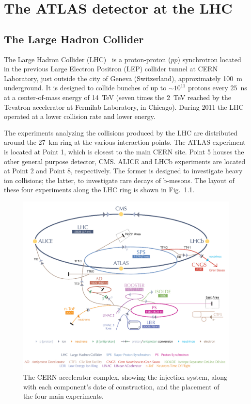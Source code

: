 
%
%
\chapter{The ATLAS detector at the LHC}

\section{The Large Hadron Collider}


The Large Hadron Collider  (LHC)~\cite{Breskin:1244506} is a proton-proton ($pp$) synchrotron located in the previous Large Electron Positron (LEP) collider tunnel at CERN Laboratory, just outside the city of Geneva (Switzerland), approximately 100~m underground. It is designed to collide bunches of up to $\sim 10^{11}$ protons every 25~ns at a center-of-mass energy of 14~TeV (seven times the 2~TeV reached by the Tevatron accelerator at Fermilab Laboratory, in Chicago). During 2011 the LHC operated at a lower collision rate and lower energy. 

The experiments analyzing the collisions produced by the LHC are distributed around the 27~km ring at the various interaction points. The ATLAS experiment is located at Point 1, which is closest to the main CERN site. Point 5 houses the other general purpose detector, CMS. ALICE and LHCb experiments are located at Point 2 and Point 8, respectively. The former is designed to investigate heavy ion collisions; the latter, to investigate rare decays of b-mesons. The layout of these four experiments along the LHC ring is shown in Fig.~\ref{fig:LHC1}.

\begin{figure}[htbp]
  \begin{center}
      \includegraphics[width=1\textwidth]{Fig2/CERNacceleratorcomplexCut.pdf}
    \caption{The CERN accelerator complex, showing the injection system, along with each component’s date of construction, and the placement of the four main experiments.}
    \label{fig:LHC1}
  \end{center}
\end{figure}


